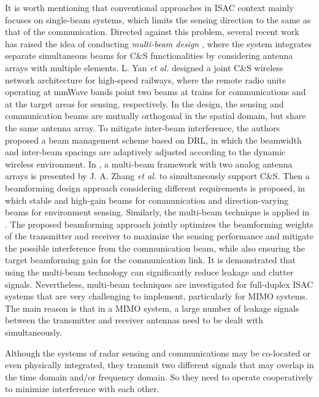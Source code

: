 \documentclass[journal,comsoc]{IEEEtran}
\begin{document}
It is worth mentioning that conventional approaches in ISAC context mainly focuses on single-beam systems, which limits the sensing direction to the same as that of the communication. Directed against this problem, several recent work has raised the idea of conducting \emph{multi-beam design} \cite{DRL-Beam-Management-ISAC-HSR-2022,Multibeam-Joint-Communication-Radar-2019,Multibeam-Design-ISAC-2020}, where the system integrates separate simultaneous beams for C\&S functionalities by considering antenna arrays with multiple elements. L. Yan \emph{et al.} \cite{DRL-Beam-Management-ISAC-HSR-2022} designed a joint C\&S wireless network architecture for high-speed railways, where the remote radio units operating at mmWave bands point two beams at trains for communications and at the target areas for sensing, respectively. In the design, the sensing and communication beams are mutually orthogonal in the spatial domain, but share the same antenna array. To mitigate inter-beam interference, the authors proposed a beam management scheme based on DRL, in which the beamwidth and inter-beam spacings are adaptively adjusted according to the dynamic wireless environment. In \cite{Multibeam-Joint-Communication-Radar-2019}, a multi-beam framework with two analog antenna arrays is presented by J. A. Zhang \emph{et al.} to simultaneously support C\&S. Then a beamforming design approach considering different requirements is proposed, in which stable and high-gain beams for communication and direction-varying beams for environment sensing. Similarly, the multi-beam technique is applied in \cite{Multibeam-Design-ISAC-2020}. The proposed beamforming approach jointly optimizes the beamforming weights of the transmitter and receiver to maximize the sensing performance and mitigate the possible interference from the communication beam, while also ensuring the target beamforming gain for the communication link. It is demonstrated that using the multi-beam technology can significantly reduce leakage and clutter signals. Nevertheless, multi-beam techniques are investigated for full-duplex ISAC systems that are very challenging to implement, particularly for MIMO systems. The main reason is that in a MIMO system, a large number of leakage signals between the transmitter and receiver antennas need to be dealt with simultaneously.


Although the systems of radar sensing and communications may be co-located or even physically integrated, they transmit two different signals that may overlap in the time domain and/or frequency domain. So they need to operate cooperatively to minimize interference with each other.
\end{document}
